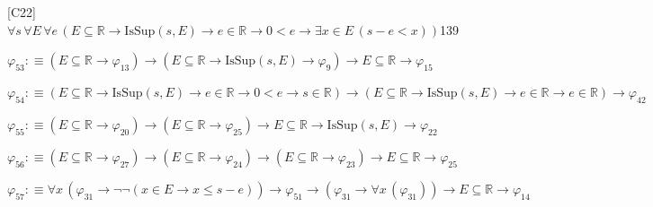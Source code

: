 \begin{fullproof}{[C22]}{$\forall s\,\forall E\,\forall e\,(E \subseteq \mathbb{R} \to \mathrm{IsSup}(s,E) \to e \in \mathbb{R} \to 0 < e \to \exists x \in E\,(s - e < x))$}{139}
\begin{abbrevlist}
\item $\varphi_{53} :\equiv (E \subseteq \mathbb{R} \to \varphi_{13}) \to (E \subseteq \mathbb{R} \to \mathrm{IsSup}(s,E) \to \varphi_{9}) \to E \subseteq \mathbb{R} \to \varphi_{15}$
\item $\varphi_{54} :\equiv (E \subseteq \mathbb{R} \to \mathrm{IsSup}(s,E) \to e \in \mathbb{R} \to 0 < e \to s \in \mathbb{R}) \to (E \subseteq \mathbb{R} \to \mathrm{IsSup}(s,E) \to e \in \mathbb{R} \to e \in \mathbb{R}) \to \varphi_{42}$
\item $\varphi_{55} :\equiv (E \subseteq \mathbb{R} \to \varphi_{20}) \to (E \subseteq \mathbb{R} \to \varphi_{25}) \to E \subseteq \mathbb{R} \to \mathrm{IsSup}(s,E) \to \varphi_{22}$
\item $\varphi_{56} :\equiv (E \subseteq \mathbb{R} \to \varphi_{27}) \to (E \subseteq \mathbb{R} \to \varphi_{24}) \to (E \subseteq \mathbb{R} \to \varphi_{23}) \to E \subseteq \mathbb{R} \to \varphi_{25}$
\item $\varphi_{57} :\equiv \forall x\,(\varphi_{31} \to \neg \neg (x \in E \to x \leq s - e)) \to \varphi_{51} \to (\varphi_{31} \to \forall x\,(\varphi_{31})) \to E \subseteq \mathbb{R} \to \varphi_{14}$
\end{abbrevlist}
\end{fullproof}
